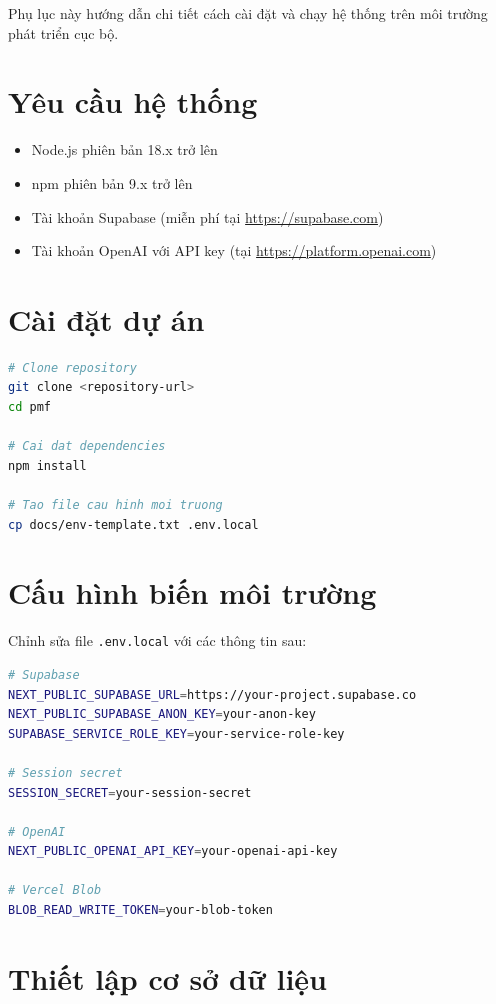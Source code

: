 \documentclass[../DoAn.tex]{subfiles}
\begin{document}
Phụ lục này hướng dẫn chi tiết cách cài đặt và chạy hệ thống trên môi trường phát triển cục bộ.

\section{Yêu cầu hệ thống}

\begin{itemize}
\item Node.js phiên bản 18.x trở lên
\item npm phiên bản 9.x trở lên
\item Tài khoản Supabase (miễn phí tại \url{https://supabase.com})
\item Tài khoản OpenAI với API key (tại \url{https://platform.openai.com})
\end{itemize}

\section{Cài đặt dự án}

\begin{lstlisting}[language=bash, caption={Các bước cài đặt dự án}]
# Clone repository
git clone <repository-url>
cd pmf

# Cai dat dependencies
npm install

# Tao file cau hinh moi truong
cp docs/env-template.txt .env.local
\end{lstlisting}

\section{Cấu hình biến môi trường}

Chỉnh sửa file \texttt{.env.local} với các thông tin sau:

\begin{lstlisting}[language=bash, caption={Các biến môi trường cần cấu hình}]
# Supabase
NEXT_PUBLIC_SUPABASE_URL=https://your-project.supabase.co
NEXT_PUBLIC_SUPABASE_ANON_KEY=your-anon-key
SUPABASE_SERVICE_ROLE_KEY=your-service-role-key

# Session secret
SESSION_SECRET=your-session-secret

# OpenAI
NEXT_PUBLIC_OPENAI_API_KEY=your-openai-api-key

# Vercel Blob
BLOB_READ_WRITE_TOKEN=your-blob-token
\end{lstlisting}

\section{Thiết lập cơ sở dữ liệu}
\end{document}
